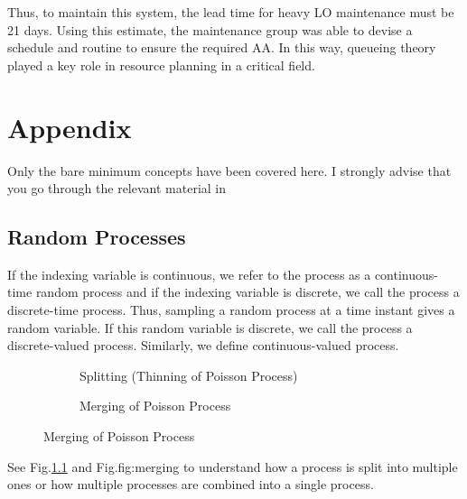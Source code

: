 \documentclass[11pt, a4paper]{report}
\begin{document}
Thus, to maintain this system, the lead time for heavy LO maintenance must be 21 days. Using this estimate, the maintenance group was able to devise a schedule and routine to ensure the required AA. In this way, queueing theory played a key role in resource planning in a critical field.

\chapter{Appendix}
Only the bare minimum concepts have been covered here. I strongly advise that you go through the relevant material in \cite{pishro2014introduction}

\section{Random Processes}
If the indexing variable is continuous, we refer to the process as a continuous-time random process and if the indexing variable is discrete, we call the process a discrete-time process. Thus, sampling a random process at a time instant gives a random variable. If this random variable is discrete, we call the process a discrete-valued process. Similarly, we define continuous-valued process. 

\begin{figure}
    \begin{subfigure}[b]{0.45\textwidth}
        \centering
        
        \caption{Splitting (Thinning of Poisson Process)}
        \label{fig:split}
    \end{subfigure}
    \hfill
    \begin{subfigure}[b]{0.45\textwidth}
        \centering
        
        \caption{Merging of Poisson Process}
        \label{fig:merging}
    \end{subfigure}
    \label{fig:splitMerge}
\end{figure}



See Fig.\ref{fig:split} and Fig.{fig:merging} to understand how a process is split into multiple ones or how multiple processes are combined into a single process.



\end{document}
